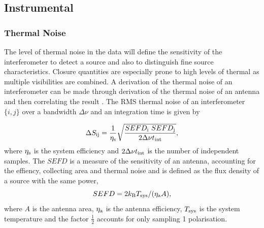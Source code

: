 \subsection{Instrumental}

\subsubsection{Thermal Noise}


The  level of thermal noise in the data will define the sensitivity of the interferometer to detect a source and also to distinguish fine source characteristics. Closure quantities are especially prone to high levels of thermal as multiple visibilities are combined. A derivation of the thermal noise of an interferometer can be made through derivation of the thermal noise of an antenna and then correlating the result \citep*{Wrobel_1999}. The RMS thermal noise of an interferometer $\{i,j\}$ over a bandwidth $\Delta \nu$ and an integration time is given by 

\begin{equation}
 \Delta S_{\rm ij} = \frac{1}{\eta_{\rm s}}\sqrt{\frac{SEFD_{\rm i}\ SEFD_{\rm j}}{2 \Delta \nu t_{\rm int}}},  
\end{equation}
where $\eta_{\rm s}$ is the system efficiency and $2 \Delta \nu t_{\rm int}$ is the number of independent samples. The $SEFD$ is a measure of the sensitivity of an antenna, accounting for the effiency, collecting area and thermal noise and is defined as the flux density of a source with the same power,
\begin{equation}
 SEFD = 2 k_{\rm B} T_{\rm sys} / (\eta_{\rm a} A),
\end{equation}
where $A$ is the antenna area, $\eta_{\rm a}$ is the antenna efficiency, $T_{\rm sys}$ is the system temperature and the factor $\frac{1}{2}$ accounts for only sampling 1 polarisation.


